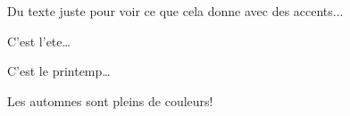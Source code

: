\documentclass[frenchb,pdftex]{scrartcl}
\begin{document}

Du texte juste pour voir ce que cela donne avec des accents...


C'est l'\gls{ete}\dots

C'est le \Gls{printemp}\dots

Les \glspl{automne} sont pleins de couleurs!

\printglossary
\end{document}
